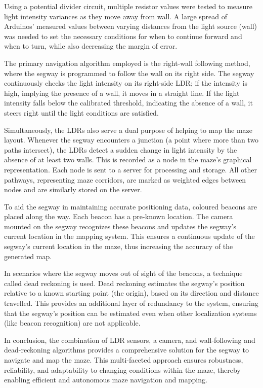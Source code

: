 Using a potential divider circuit, multiple resistor values were tested to measure light intensity variances as they move away from wall. A large spread of Arduinos’ measured values between varying distances from the light source (wall) was needed to set the necessary conditions for when to continue forward and when to turn, while also decreasing the margin of error.

The primary navigation algorithm employed is the right-wall following method, where the segway is programmed to follow the wall on its right side. The segway continuously checks the light intensity on its right-side LDR; if the intensity is high, implying the presence of a wall, it moves in a straight line. If the light intensity falls below the calibrated threshold, indicating the absence of a wall, it steers right until the light conditions are satisfied.

Simultaneously, the LDRs also serve a dual purpose of helping to map the maze layout. Whenever the segway encounters a junction (a point where more than two paths intersect), the LDRs detect a sudden change in light intensity by the absence of at least two walls. This is recorded as a node in the maze's graphical representation. Each node is sent to a server for processing and storage. All other pathways, representing maze corridors, are marked as weighted edges between nodes and are similarly stored on the server.

To aid the segway in maintaining accurate positioning data, coloured beacons are placed along the way. Each beacon has a pre-known location. The camera mounted on the segway recognizes these beacons and updates the segway's current location in the mapping system. This ensures a continuous update of the segway's current location in the maze, thus increasing the accuracy of the generated map.

In scenarios where the segway moves out of sight of the beacons, a technique called dead reckoning is used. Dead reckoning estimates the segway's position relative to a known starting point (the origin), based on its direction and distance travelled. This provides an additional layer of redundancy to the system, ensuring that the segway's position can be estimated even when other localization systems (like beacon recognition) are not applicable.

In conclusion, the combination of LDR sensors, a camera, and wall-following and dead-reckoning algorithms provides a comprehensive solution for the segway to navigate and map the maze. This multi-faceted approach ensures robustness, reliability, and adaptability to changing conditions within the maze, thereby enabling efficient and autonomous maze navigation and mapping.

